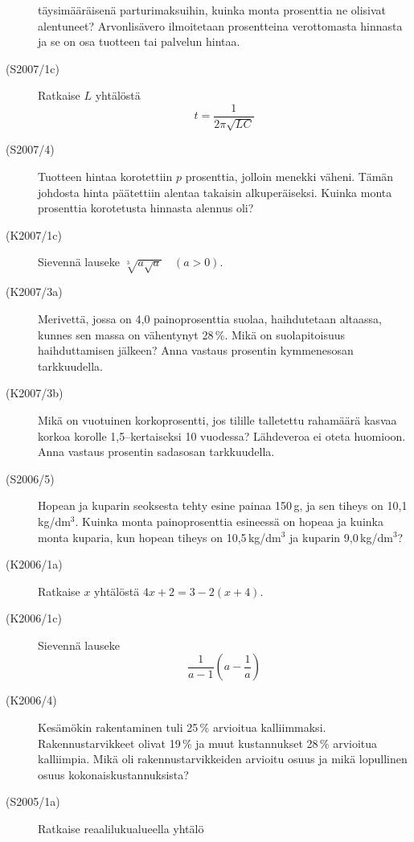 \begin{description}
                        täysimääräisenä parturimaksuihin, kuinka monta prosenttia
                        ne olisivat alentuneet? Arvonlisävero ilmoitetaan prosentteina
                        verottomasta hinnasta ja se on osa tuotteen tai palvelun hintaa.
    \item[(S2007/1c)]  Ratkaise $L$ yhtälöstä
                        \[ t = \frac{1}{2\pi\sqrt{LC}} \]
    \item[(S2007/4)]   Tuotteen hintaa korotettiin $p$ prosenttia, jolloin menekki väheni.
                        Tämän johdosta hinta päätettiin alentaa takaisin alkuperäiseksi.
                        Kuinka monta prosenttia korotetusta hinnasta alennus oli?
    \item[(K2007/1c)]  Sievennä lauseke $ \sqrt[3]{a \sqrt{a}} \quad (a > 0) $.
    \item[(K2007/3a)]  Merivettä, jossa on 4,0 painoprosenttia suolaa, haihdutetaan
                        altaassa, kunnes sen massa on vähentynyt 28\,\%. Mikä on
                        suolapitoisuus haihduttamisen jälkeen? Anna vastaus prosentin
                        kymmenesosan tarkkuudella. 
    \item[(K2007/3b)]  Mikä on vuotuinen korkoprosentti, jos tilille talletettu rahamäärä
                        kasvaa korkoa korolle 1,5--kertaiseksi 10 vuodessa? Lähdeveroa
                        ei oteta huomioon. Anna vastaus prosentin sadasosan 
                        tarkkuudella.
    \item[(S2006/5)]   Hopean ja kuparin seoksesta tehty esine painaa 150\,g, ja sen
                        tiheys on 10,1\,kg/dm\(^3\). Kuinka monta painoprosenttia
                        esineessä on hopeaa ja kuinka monta kuparia, kun hopean tiheys on 
                        10,5\,kg/dm\(^3\) ja kuparin 9,0\,kg/dm\(^3\)?
    \item[(K2006/1a)]  Ratkaise $x$ yhtälöstä $4x + 2 =  3 - 2(x + 4)$.
    \item[(K2006/1c)]  Sievennä lauseke 
                        \[ \frac{1}{a - 1} \left( a - \frac{1}{a} \right) \]
    \item[(K2006/4)]   Kesämökin rakentaminen tuli 25\,\% arvioitua kalliimmaksi.
                        Rakennustarvikkeet olivat 19\,\% ja muut kustannukset 28\,\%
                        arvioitua kalliimpia. Mikä oli rakennustarvikkeiden arvioitu osuus ja 
                        mikä lopullinen osuus kokonaiskustannuksista?
    \item[(S2005/1a)]  Ratkaise reaalilukualueella yhtälö 

\end{description}
